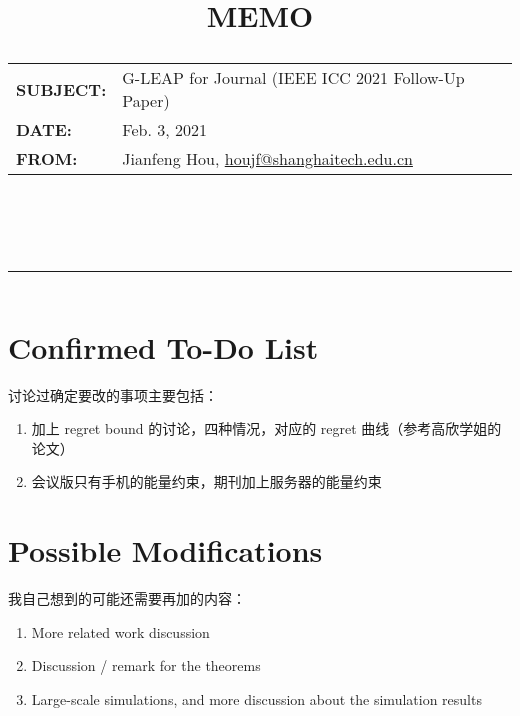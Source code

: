 \documentclass[10pt, a4paper]{article}
\title{
    \notosanssc\selectfont
    \textbf{\fontsize{40}{48}\selectfont MEMO}\\
    \vspace{2em}
    {\fontsize{13}{15.6}\selectfont
    \renewcommand{\arraystretch}{1.5}
    \begin{tabular}{@{}ll}
        \textbf{SUBJECT:} & G-LEAP for Journal (IEEE ICC 2021 Follow-Up Paper)\\
        \textbf{DATE:} & Feb. 3, 2021\\
        \textbf{FROM:} & Jianfeng Hou, \href{mailto:houjf@shanghaitech.edu.cn}{houjf@shanghaitech.edu.cn}
    \end{tabular}
    }
    \vspace{1em}\\
    \textcolor{MyUnderlineColor}{\rule{\textwidth}{1.5pt}}
}
\author{
}
\date{
}
\begin{document}
    
    \maketitle
    \thispagestyle{empty}
    
%    
    
    \vspace{-2cm}
    
    \section{Confirmed To-Do List}
    
    讨论过确定要改的事项主要包括：
    \begin{enumerate}[label=(\arabic*)]
        \item 加上 regret bound 的讨论，四种情况，对应的 regret 曲线（参考高欣学姐的论文）
        \item 会议版只有手机的能量约束，期刊加上服务器的能量约束
    \end{enumerate}
    
    \section{Possible Modifications}
    
    我自己想到的可能还需要再加的内容：
    \begin{enumerate}[label=(\arabic*), resume]
        \item More related work discussion
        \item Discussion / remark for the theorems
        \item Large-scale simulations, and more discussion about the simulation results
    \end{enumerate}
    
\end{document}
